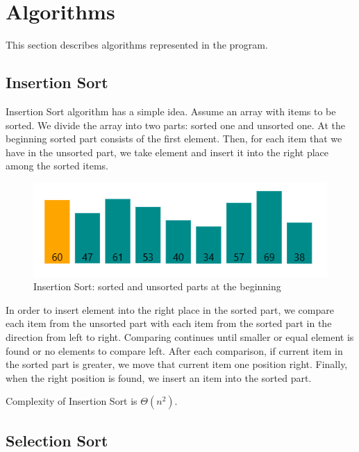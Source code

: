 \documentclass[
  field=inf,
  biblatex,
  language=english,
  glossaries,
  theorems=false,
  index
]{kidiplom}
\begin{document}
\newpage
\section{Algorithms}

This section describes algorithms represented in the program.

\subsection{Insertion Sort}
\label{sec:insertion}
Insertion Sort algorithm has a simple idea. Assume an array with items to be sorted. We divide the array into two parts: sorted one and unsorted one. At the beginning sorted part consists of the first element. Then, for each item that we have in the unsorted part, we take element and insert it into the right place among the sorted items.

\begin{figure}[H]
\begin{center}
	
	\includegraphics[scale=0.7]{img/Insertion.png}
	\caption{Insertion Sort: sorted and unsorted parts at the beginning}\label{fig:insert}
\end{center}
\end{figure}

In order to insert element into the right place in the sorted part, we compare each item from the unsorted part with each item from the sorted part in the direction from left to right. Comparing continues until smaller or equal element is found or no elements to compare left. After each comparison, if current item in the sorted part is greater, we move that current item one position right. Finally, when the right position is found, we insert an item into the sorted part.

Complexity of Insertion Sort is $\Theta(n^2)$.

\subsection{Selection Sort}
\label{sec:selection}
\end{document}

